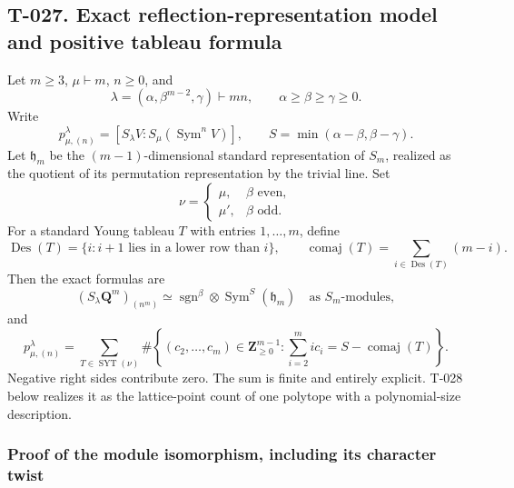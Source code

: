 \documentclass[
  10pt,
]{article}
\begin{document}
\subsection{T-027. Exact reflection-representation model and positive
tableau
formula}\label{t-027.-exact-reflection-representation-model-and-positive-tableau-formula}

Let \(m\ge3\), \(\mu\vdash m\), \(n\ge0\), and \[
\lambda=(\alpha,\beta^{m-2},\gamma)\vdash mn,
\qquad \alpha\ge\beta\ge\gamma\ge0.
\] Write \[
p_{\mu,(n)}^\lambda=[S_\lambda V:S_\mu(\operatorname{Sym}^nV)],
\qquad
S=\min(\alpha-\beta,\beta-\gamma).
\tag{S.1}
\] Let \(\mathfrak h_m\) be the \((m-1)\)-dimensional standard
representation of \(S_m\), realized as the quotient of its permutation
representation by the trivial line. Set \[
\nu=\begin{cases}\mu,&\beta\text{ even},\\ \mu',&\beta\text{ odd}.\end{cases}
\tag{S.2}
\] For a standard Young tableau \(T\) with entries \(1,\ldots,m\),
define \[
\operatorname{Des}(T)=\{i: i+1\text{ lies in a lower row than }i\},
\qquad
\operatorname{comaj}(T)=\sum_{i\in\operatorname{Des}(T)}(m-i).
\tag{S.3}
\] Then the exact formulas are \[
\boxed{
(S_\lambda\mathbf Q^m)_{(n^m)}
\simeq\operatorname{sgn}^{\beta}\otimes
\operatorname{Sym}^{S}(\mathfrak h_m)
\quad\text{as }S_m\text{-modules},}
\tag{S.4}
\] and \[
\boxed{
p_{\mu,(n)}^\lambda
=\sum_{T\in\operatorname{SYT}(\nu)}
\#\left\{(c_2,\ldots,c_m)\in\mathbf Z_{\ge0}^{m-1}:
\sum_{i=2}^m i c_i=S-\operatorname{comaj}(T)\right\}.}
\tag{S.5}
\] Negative right sides contribute zero. The sum is finite and entirely
explicit. T-028 below realizes it as the lattice-point count of one
polytope with a polynomial-size description.

\subsubsection{Proof of the module isomorphism, including its character
twist}\label{proof-of-the-module-isomorphism-including-its-character-twist}
\end{document}
